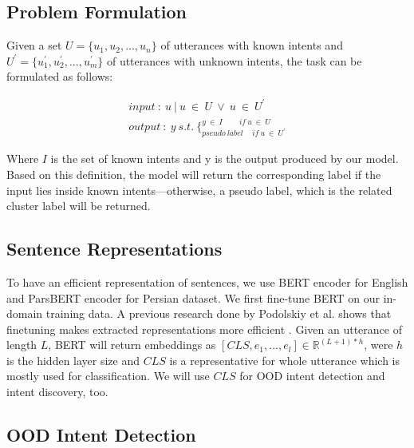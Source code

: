 \documentclass{article}
\begin{document}
\subsection{Problem Formulation}

\noindent Given a set \begin{math}U = \{u_{1}, u_{2}, ..., u_{n}\}\end{math} of utterances with known intents and
\begin{math}U^{\prime} = \{u_{1}^{\prime}, u_{2}^{\prime}, ..., u_{m}^{\prime}\}\end{math} of utterances with unknown intents,
the task can be formulated as follows:

\begin{gather*}
  input\ :\ u\ |\ u\ \in\ U\ \vee\ u\ \in\ U^{\prime} \\
  output\ :\ y\ s.t.\ \bigg\{_{pseudo\ label\,\quad if\ u\ \in\ U^{\prime}}^{y\ \in\ I\,\qquad if\ u\ \in\ U}
\end{gather*}

Where $I$ is the set of known intents and y is the output produced by our model. 
Based on this definition, the model will return the corresponding label if the input lies inside known intents—otherwise,
a pseudo label, which is the related cluster label will be returned.

\subsection{Sentence Representations}

To have an efficient representation of sentences, we use BERT encoder \citep{vaswani2017attention} for English and ParsBERT encoder \citep{farahani2021parsbert} for Persian dataset.
We first fine-tune BERT on our in-domain training data. A previous research done by Podolskiy et al. shows that
finetuning makes extracted representations more efficient \citep{podolskiy2021revisiting}.
Given an utterance of length $L$, BERT will return embeddings as $[CLS, e_{1}, ..., e_{l}] \in \mathbb{R}^{(L+1)*h}$,
were $h$ is the hidden layer size and $CLS$ is a representative for whole utterance which is mostly used for classification.
We will use $CLS$ for OOD intent detection and intent discovery, too.

\subsection{OOD Intent Detection}\label{id}
\end{document}

